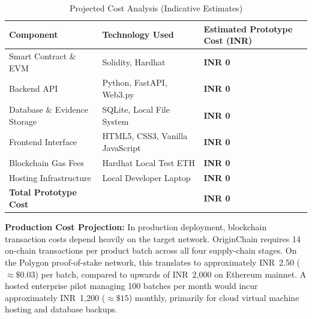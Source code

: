 \documentclass[12pt,a4paper]{report}
\begin{document}
\begin{table}[H]
\centering
\caption{Projected Cost Analysis (Indicative Estimates)}
\label{tab:cost}
\small
\renewcommand{\arraystretch}{1.22}
\begin{tabularx}{\textwidth}{L{4.5cm} L{4.5cm} Y}
\toprule
\textbf{Component} & \textbf{Technology Used} & \textbf{Estimated Prototype Cost (INR)} \\
\midrule
Smart Contract \& EVM & Solidity, Hardhat & \textbf{INR 0} \\
Backend API & Python, FastAPI, Web3.py & \textbf{INR 0} \\
Database \& Evidence Storage & SQLite, Local File System & \textbf{INR 0} \\
Frontend Interface & HTML5, CSS3, Vanilla JavaScript & \textbf{INR 0} \\
Blockchain Gas Fees & Hardhat Local Test ETH & \textbf{INR 0} \\
Hosting Infrastructure & Local Developer Laptop & \textbf{INR 0} \\
\midrule
\textbf{Total Prototype Cost} & & \textbf{INR 0} \\
\bottomrule
\end{tabularx}
\end{table}

\noindent \textbf{Production Cost Projection:}
In production deployment, blockchain transaction costs depend heavily on the target network. OriginChain requires 14 on-chain transactions per product batch across all four supply-chain stages. On the Polygon proof-of-stake network, this translates to approximately INR~2.50 ($\approx \$0.03$) per batch, compared to upwards of INR~2,000 on Ethereum mainnet. A hosted enterprise pilot managing 100 batches per month would incur approximately INR~1,200 ($\approx \$15$) monthly, primarily for cloud virtual machine hosting and database backups.
\end{document}
